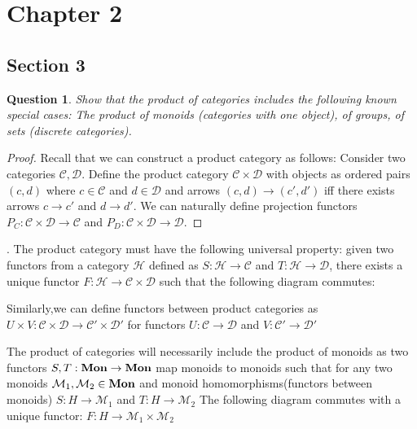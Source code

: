 \documentclass[12pt]{article}
\newtheorem{question}{Question}[section]
\theoremstyle{remark}
\begin{document}
\section{Chapter 2}

\subsection{Section 3}

\begin{question}
 Show that the product of categories includes the following known special cases: The product of monoids 
 (categories with one object), of groups, of sets (discrete categories).
\end{question}

\begin{proof}
 Recall that we can construct a product category as follows: Consider two categories $\mathcal{C},\mathcal{D}$. Define the product category $\mathcal{C} \times \mathcal{D}$ with objects as ordered pairs $(c,d)$ where $c \in \mathcal{C}$ and $d \in \mathcal{D}$
 and arrows $(c,d) \rightarrow (c',d')$ iff there exists arrows $c \rightarrow c'$ and $d \rightarrow d'$. We can naturally define projection functors
 $P_C : \mathcal{C \times D} \rightarrow \mathcal{C}$ and $P_D: \mathcal{C \times D} \rightarrow \mathcal{D}$.
\end{proof}. The product category must have the following universal property: given two functors from a category $\mathcal{H}$ defined as $S: \mathcal {H} \rightarrow \mathcal{C}$ and
$T: \mathcal {H} \rightarrow \mathcal{D}$, there exists a unique functor $F: \mathcal{H} \rightarrow \mathcal{C} \times \mathcal{D}$
such that the following diagram commutes:

\begin{figure}[!h]
\centering
\end{figure}

Similarly,we can define functors between product categories as $U \times V: \mathcal{C \times D} \rightarrow \mathcal{C' \times D'}$
for functors $U: \mathcal{C} \rightarrow \mathcal{D}$ and $V: \mathcal{C'} \rightarrow \mathcal{D'}$

The product of categories will necessarily include the product of monoids as two functors $S,T: {\bf Mon} \rightarrow {\bf Mon}$ map monoids to monoids such that for any two monoids $ \mathcal{M}_1,\mathcal{M}_2 \in {\bf Mon}$ and monoid homomorphisms(functors between monoids) $S: H \rightarrow \mathcal{M}_1$ and $T:H \rightarrow \mathcal{M}_2$
The following diagram commutes with a unique functor: $F: H \rightarrow \mathcal{M}_1 \times \mathcal{M}_2$
\end{document}

